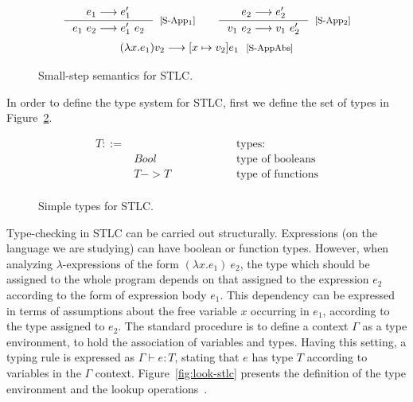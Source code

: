 \documentclass[tese,capa,english]{texufpel}
\begin{document}
\begin{figure}[!htb]
\[
\begin{array}{ccc}    
  \inference{e_1 --> e_1'}
            {e_1 ~ e_2 --> e_1' ~ e_2}[\textrm{[S-App$_1$]}]
& &
  \inference{e_2 --> e_2'}
            {v_1 ~ e_2 --> v_1 ~ e_2'}[\textrm{[S-App$_2$]}]
\end{array}    
\]
\vspace{3pt}
\[
\begin{array}{ccc}
  & (\lambda x . e_1) v_2 --> \lbrack x \mapsto v_2 \rbrack e_1 \ \ \footnotesize\textrm{[S-AppAbs]} &
\end{array}    
\]
\caption{Small-step semantics for STLC.}
\label{fig:small-stlc}
\end{figure}

In order to define the type system for STLC, first we define the set of types in Figure~\ref{fig:types-stlc}. %

\begin{figure}[!htb]
\[
\begin{array}{llr}
  T ::= & \ \ \ \ \ \ \ \ \ \ \ \ \ \ \ \ \ \ \ \ \ \ \ \ \ \ \ \ \ \ \ \ \ \ \ \ \ \ & \textrm{types: } \\
        & Bool  & \textrm{type of booleans} \\
        & T -> T & \textrm{type of functions} \\
\end{array}
\]
\caption{Simple types for STLC.}
\label{fig:types-stlc}
\end{figure}

Type-checking in STLC can be carried out structurally. Expressions (on the language we are studying) can have boolean or function types. However, when analyzing $\lambda$-expressions of the form $(\lambda x . e_1) ~ e_2$, the type which should be assigned to the whole program depends on that assigned to the expression $e_2$ according to the form of expression body $e_1$. This dependency can be expressed in terms of assumptions about the free variable $x$ occurring in $e_1$, according to the type assigned to $e_2$. The standard procedure is to define a context $\Gamma$ as a type environment, to hold the association of variables and types. Having this setting, a typing rule is expressed as $\Gamma \vdash e : T$, stating that $e$ has type $T$ according to variables in the $\Gamma$ context. Figure~\ref{fig:look-stlc} presents the definition of the type environment and the lookup operations~\cite{Wadler-plfa}.
\end{document}
